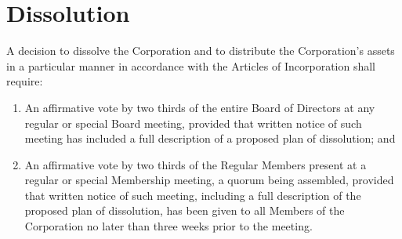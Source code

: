 \section{Dissolution}
\label{sec:dissolution}
\noindent
A decision to dissolve the Corporation and to distribute the
Corporation's assets in a particular manner in accordance with the
Articles of Incorporation shall require:
\begin{enumerate}
  \item An affirmative vote by two thirds of the entire Board of
    Directors at any regular or special Board meeting, provided that
    written notice of such meeting has included a full description of
    a proposed plan of dissolution; and
  \item An affirmative vote by two thirds of the Regular Members
    present at a regular or special Membership meeting, a quorum being
    assembled, provided that written notice of such meeting, including
    a full description of the proposed plan of dissolution, has been
    given to all Members of the Corporation no later than three weeks
    prior to the meeting.
\end{enumerate}
